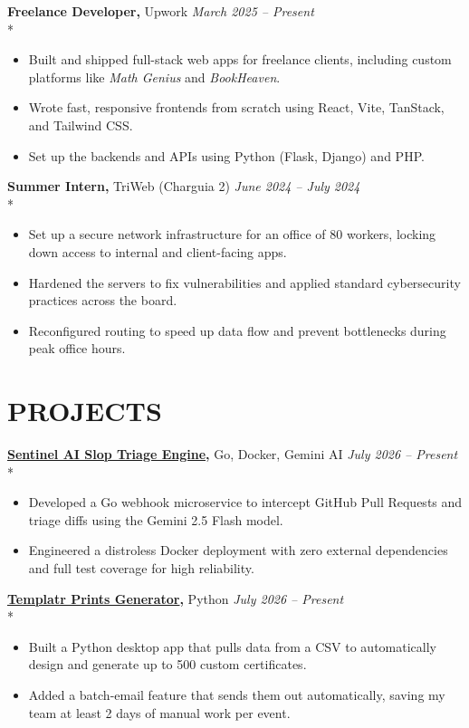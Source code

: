 \documentclass[10pt,letterpaper]{article}
\newcommand{\experienceItem}[4]{%
    \textbf{#1,} #2 \hfill \textit{#3 -- #4}\\*%
}
\begin{document}
\experienceItem{Freelance Developer}{Upwork}{March 2025}{Present}
\begin{itemize}[leftmargin=*, noitemsep, topsep=0pt]
    \item Built and shipped full-stack web apps for freelance clients, including custom platforms like \textit{Math Genius} and \textit{BookHeaven}.
    \item Wrote fast, responsive frontends from scratch using React, Vite, TanStack, and Tailwind CSS.
    \item Set up the backends and APIs using Python (Flask, Django) and PHP.
\end{itemize}
\vspace{4pt}

\experienceItem{Summer Intern}{TriWeb (Charguia 2)}{June 2024}{July 2024}
\begin{itemize}[leftmargin=*, noitemsep, topsep=0pt]
    \item Set up a secure network infrastructure for an office of 80 workers, locking down access to internal and client-facing apps.
    \item Hardened the servers to fix vulnerabilities and applied standard cybersecurity practices across the board.
    \item Reconfigured routing to speed up data flow and prevent bottlenecks during peak office hours.
\end{itemize}
\vspace{4pt}

\section*{PROJECTS}

\experienceItem{\href{https://github.com/Bechir-afk/Sentinel-AI-Slop-Triage-Engine}{Sentinel AI Slop Triage Engine}}{Go, Docker, Gemini AI}{July 2026}{Present}
\begin{itemize}[leftmargin=*, noitemsep, topsep=0pt]
    \item Developed a Go webhook microservice to intercept GitHub Pull Requests and triage diffs using the Gemini 2.5 Flash model.
    \item Engineered a distroless Docker deployment with zero external dependencies and full test coverage for high reliability.
\end{itemize}
\vspace{4pt}

\experienceItem{\href{https://github.com/Bechir-afk/Templatr--Prints-Generator}{Templatr Prints Generator}}{Python}{July 2026}{Present}
\begin{itemize}[leftmargin=*, noitemsep, topsep=0pt]
    \item Built a Python desktop app that pulls data from a CSV to automatically design and generate up to 500 custom certificates.
    \item Added a batch-email feature that sends them out automatically, saving my team at least 2 days of manual work per event.
\end{itemize}
\vspace{4pt}
\end{document}
